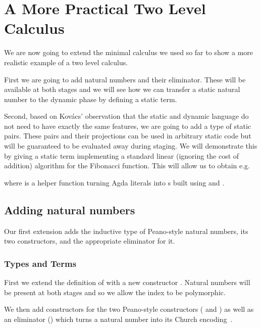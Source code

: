 \documentclass{article}
\begin{document}
\section{A More Practical Two Level Calculus}

We are now going to extend the minimal calculus we used so far to
show a more realistic example of a two level calculus.

First we are going to add natural numbers and their eliminator.
These will be available at both stages and we will see how we
can transfer a static natural number to the dynamic phase by
defining a static  term.

Second, based on Kov{\'{a}}cs' observation that the static and
dynamic language do not need to have exactly the same features,
we are going to add a type of static pairs.
%
These pairs and their projections can be used in arbitrary static
code but will be guaranteed to be evaluated away during staging.
%
We will demonstrate this by giving a static term 
implementing a standard linear (ignoring the cost of addition)
algorithm for the Fibonacci function.
%
This will allow us to obtain e.g.


\noindent where  is a helper function turning Agda
literals into s built using  and .

\subsection{Adding natural numbers}

Our first extension adds the inductive type of Peano-style natural numbers,
its two constructors, and the appropriate eliminator for it.

\subsubsection{Types and Terms}

First we extend the definition of  with a new constructor
. Natural numbers will be present at both stages and so we
allow the index to be polymorphic.


We then add  constructors for the two Peano-style
constructors ( and ) as well as an
eliminator () which turns a natural number into
its Church encoding~\cite[Chapter 3]{church1941calculi}.
\end{document}
